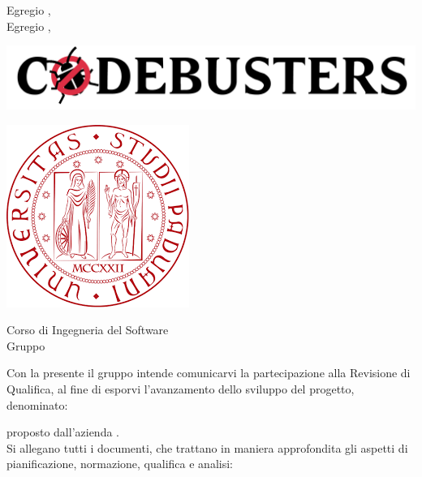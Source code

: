 \documentclass[11pt]{letter}
\begin{document}
    \begin{letter}
        { Egregio \VT{},\\Egregio \CR{},}
        \begin{minipage}{.4\textwidth}
            \begin{flushleft}
                \includegraphics[width=1.5\textwidth]{Utility/Images/logo2.png}
            \end{flushleft}
        \end{minipage}
        \begin{minipage}{.5\textwidth}
            \begin{flushright}
                \includegraphics[width=.4\linewidth]{Utility/Images/logoUnipd.png}
            \end{flushright}
        \end{minipage}
        {    
        \begin{flushleft}
            Corso di Ingegneria del Software\\ Gruppo \Gruppo{}\\ 
        \end{flushleft}
        }
        \opening{ Con la presente il gruppo \Gruppo{} intende comunicarvi la partecipazione alla Revisione di Qualifica, al fine di esporvi l'avanzamento dello sviluppo del progetto, denominato:}
        \begin{center}
           \textbf{\NomeProgetto{}} 
        \end{center}
        proposto dall'azienda \textbf{\Proponente{}}.\\
        Si allegano tutti i documenti, che trattano in maniera approfondita gli aspetti di pianificazione, normazione, qualifica e analisi:
        \begin{itemize}

\end{itemize}
\end{letter}
\end{document}
